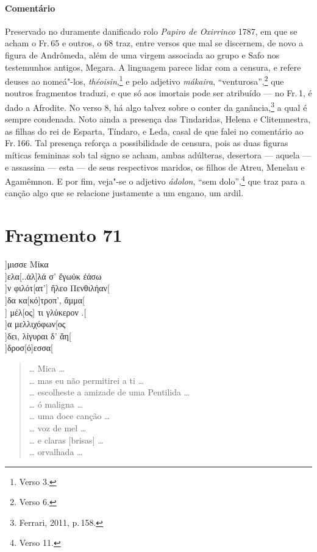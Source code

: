 \paragraph{Comentário} Preservado no duramente danificado rolo \emph{Papiro de Oxirrinco} 1787, em que se acham o Fr.\,65 e outros, o 68 traz, entre versos que mal se discernem, de novo a figura de Andrômeda, além de uma virgem associada ao grupo e Safo nos testemunhos antigos, Megara.  A linguagem parece lidar com a censura, e refere deuses ao nomeá"-los, \emph{théoisin},\footnote{Verso 3.} e pelo adjetivo \emph{mákaira}, ``venturosa'',\footnote{Verso 6.} que noutros fragmentos traduzi, e que só aos imortais pode ser atribuído --- no Fr.\,1, é dado a Afrodite. No verso 8, há algo talvez sobre o conter da ganância,\footnote{Ferrari, 2011, p.\,158.} a qual é sempre condenada. Noto ainda a presença das Tindaridas, Helena e Clitemnestra, as filhas do rei de Esparta, Tíndaro, e Leda, casal de que falei no comentário ao Fr.\,166. Tal presença reforça a possibilidade de censura, pois as duas figuras míticas femininas sob tal signo se acham, ambas adúlteras, desertora --- aquela --- e assassina --- esta --- de seus respectivos maridos, os filhos de Atreu, Menelau e Agamêmnon. E por fim, veja"-se o adjetivo \emph{ádolon}, ``sem dolo'',\footnote{Verso 11.} que traz para a canção algo que se relacione justamente a um engano, um ardil.




\section{Fragmento 71}

\begin{gkverse}
]μισσε Μίκα\\
]ελα[..ἀλ]λά σ’ ἔγωὐκ ἐάσω\\
         ]ν φιλότ[ατ’] ἤλεο Πενθιλήαν[\\
]δα κα[κό]τροπ’, ἄμμα[\\
    ] μέλ[ος] τι γλύκερον .[\\
    ]α μελλιχόφων[ος\\
    ]δει, λίγυραι δ’ ἄη[\\
        ]δροσ[ό]εσσα[
\end{gkverse}

\begin{verse}
\ldots{} Mica \ldots{}\\
\ldots{} mas eu não permitirei a ti \ldots{}\\
\ldots{} escolheste a amizade de uma Pentilida \ldots{}\\
\ldots{} ó maligna \ldots{}\\
\ldots{} uma doce canção \ldots{}\\
\ldots{} voz de mel \ldots{}\\
\ldots{} e claras [brisas] \ldots{}\\
\ldots{} orvalhada \ldots{}
\end{verse}

